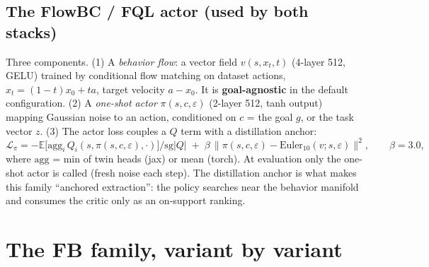\documentclass[11pt]{article}
\newcommand{\E}{\mathbb{E}}
\newcommand{\sg}{\mathrm{sg}}
\begin{document}
\subsection{The FlowBC / FQL actor (used by both stacks)}\label{sec:flowbc}
Three components. (1) A \emph{behavior flow}: a vector field $v(s,x_t,t)$ (4-layer 512,
GELU) trained by conditional flow matching on dataset actions, $x_t=(1{-}t)x_0+ta$,
target velocity $a-x_0$. It is \textbf{goal-agnostic} in the default configuration. (2) A
\emph{one-shot actor} $\pi(s,c,\varepsilon)$ (2-layer 512, tanh output) mapping Gaussian
noise to an action, conditioned on $c$ = the goal $g$, or the task vector $z$. (3) The
actor loss couples a $Q$ term with a distillation anchor:
\begin{equation}
\mathcal L_\pi = -\E\big[\mathrm{agg}_i\, Q_i(s,\pi(s,c,\varepsilon),\cdot)\big]/\sg|Q|
\;+\; \beta\,\big\|\pi(s,c,\varepsilon)-\mathrm{Euler}_{10}(v;s,\varepsilon)\big\|^2,
\qquad \beta=3.0,
\end{equation}
where $\mathrm{agg}$ = min of twin heads (jax) or mean (torch). At evaluation only the
one-shot actor is called (fresh noise each step). The distillation anchor is what makes this
family ``anchored extraction'': the policy searches near the behavior manifold and consumes
the critic only as an on-support ranking.

\section{The FB family, variant by variant}\label{sec:variants}
\end{document}
